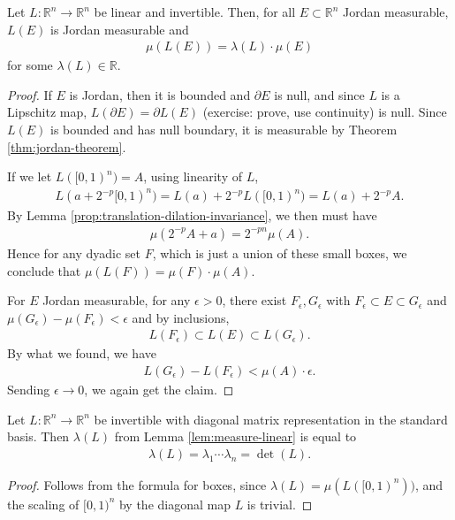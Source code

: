 \begin{lemma}\label{lem:measure-linear}
	Let $L: \mathbb{R}^{n} \to \mathbb{R}^{n}$ be linear and invertible. Then, for all $E \subset \mathbb{R}^{n}$ Jordan measurable, $L(E)$ is Jordan measurable and
	\begin{align*}
		\mu(L(E)) = \lambda(L) \cdot \mu(E)
	\end{align*}
	for some $\lambda(L) \in \mathbb{R}$.
\end{lemma}
\begin{proof}
	If $E$ is Jordan, then it is bounded and $\partial E$ is null, and since $L$ is a Lipschitz map, $L(\partial E) = \partial L(E)$ (exercise: prove, use continuity) is null. Since $L(E)$ is bounded and has null boundary, it is measurable by Theorem \ref{thm:jordan-theorem}.

	If we let $L([0,1)^{n}) = A$, using linearity of $L$,
	\begin{align*}
		L(a + 2^{-p}[0,1)^{n}) = L (a) + 2^{-p} L([0,1)^{n}) = L(a) + 2^{-p} A.
	\end{align*}
	By Lemma \ref{prop:translation-dilation-invariance}, we then must have
	\begin{align*}
		\mu(2^{-p}A + a) = 2^{-pn} \mu(A).
	\end{align*}
	Hence for any dyadic set $F$, which is just a union of these small boxes, we conclude that $\mu(L(F)) = \mu(F) \cdot \mu(A)$.

	For $E$ Jordan measurable, for any $\epsilon > 0$, there exist $F_{\epsilon}, G_{\epsilon}$ with $F_{\epsilon} \subset E \subset G_{\epsilon}$ and $\mu(G_{\epsilon}) - \mu(F_{\epsilon}) < \epsilon$ and by inclusions,
	\begin{align*}
		L(F_{\epsilon}) \subset L(E) \subset L(G_{\epsilon}).
	\end{align*}
	By what we found, we have
	\begin{align*}
		L(G_{\epsilon}) - L(F_{\epsilon}) < \mu(A) \cdot \epsilon.
	\end{align*}
	Sending $\epsilon \to 0$, we again get the claim.
\end{proof}

\begin{lemma}\label{lem:spec-stretch-lem}
	Let $L : \mathbb{R}^{n} \to \mathbb{R}^{n}$ be invertible with diagonal matrix representation in the standard basis. Then $\lambda(L)$ from Lemma \ref{lem:measure-linear} is equal to
	\begin{align*}
		\lambda(L) = \lambda_{1} \cdots \lambda_{n} = \det (L).
	\end{align*}
\end{lemma}
\begin{proof}
	Follows from the formula for boxes, since $\lambda(L) = \mu(L([0,1)^{n}))$, and the scaling of $[0,1)^{n}$ by the diagonal map $L$ is trivial.
\end{proof}

